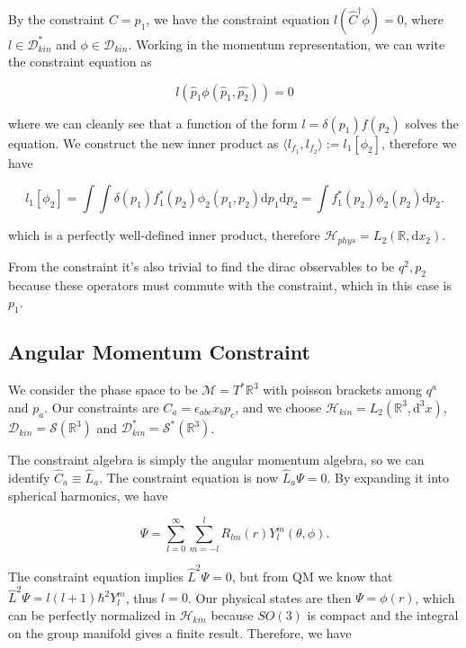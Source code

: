 \documentclass{article}
\begin{document}
By the constraint $C = p_1$, we have the constraint equation $l(\hat{C}^\dagger\phi) = 0$, where $l \in \mathcal{D}^\ast_{kin}$ and $\phi \in \mathcal{D}_{kin}$. Working in the momentum representation, we can write the constraint equation as

$$
l(\hat{p}_1\phi(\hat{p}_1, \hat{p_2})) = 0
$$

where we can cleanly see that a function of the form $l = \delta(p_1)f(p_2)$ solves the equation. We construct the new inner product as $\langle l_{f_1}, l_{f_2}\rangle := l_1[\phi_2]$, therefore we have

$$
l_1[\phi_2] = \int \int \delta(p_1) f_1^*(p_2) \phi_2(p_1, p_2) \mathrm{d}p_1 \mathrm{d}p_2 = \int f_1^*(p_2) \phi_2(p_2) \mathrm{d}p_2.
$$

which is a perfectly well-defined inner product, therefore $\mathcal{H}_{phys} = L_2(\mathbb{R},\mathrm{d}x_2)$.

From the constraint it's also trivial to find the dirac observables to be $q^2, p_2$ because these operators must commute with the constraint, which in this case is $p_1$.

\hrulefill

\subsection{Angular Momentum Constraint}

We consider the phase space to be $\mathcal{M} = T^\ast \mathbb{R}^3$ with poisson brackets among $q^a$ and $p_a$. Our constraints are $C_a = \epsilon_{abc}x_bp_c$, and we choose $\mathcal{H}_{kin} = L_2(\mathbb{R}^3, \mathrm{d}^3x)$, $\mathcal{D}_{kin} = \mathcal{S}(\mathbb{R}^3)$ and $\mathcal{D}^\ast_{kin} = \mathcal{S}^\ast(\mathbb{R}^3)$.

The constraint algebra is simply the angular momentum algebra, so we can identify $\hat{C}_a \equiv \hat{L}_a$. The constraint equation is now $\hat{L}_a \Psi = 0$. By expanding it into spherical harmonics, we have

$$
\Psi = \sum_{l = 0}^{\infty}\sum_{m = -l}^lR_{lm}(r)Y^m_l(\theta,\phi).
$$

The constraint equation implies $\hat{L}^2\Psi = 0$, but from QM we know that $\hat{L}^2\Psi = l(l+1)\hbar^2Y^m_l$, thus $l = 0$. Our physical states are then $\Psi = \phi(r)$, which can be perfectly normalized in $\mathcal{H}_{kin}$ because $SO(3)$ is compact and the integral on the group manifold gives a finite result. Therefore, we have
\end{document}
